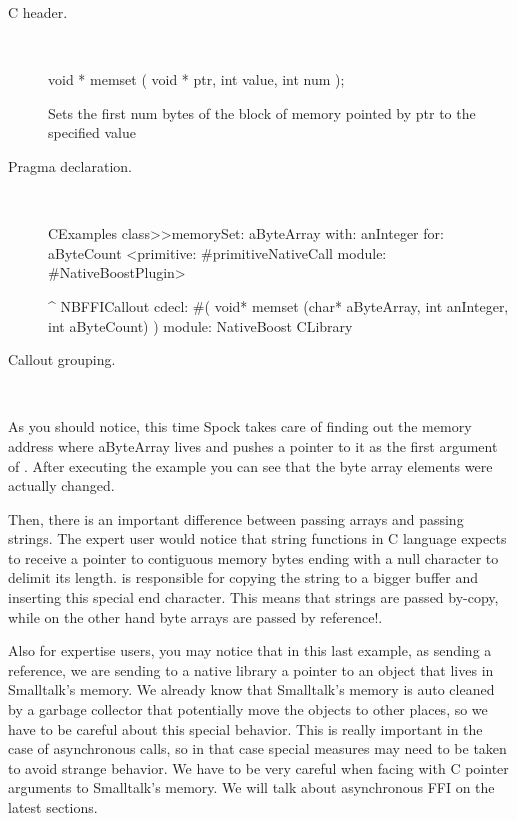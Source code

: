 \documentclass[a4paper,10pt,twoside]{book}
\begin{document}
\begin{description}
\item [C header.] \ 

\begin{code}{}
void * memset ( void * ptr, int value, int num );
\end{code}
Sets the first num bytes of the block of memory pointed by ptr to the specified value

\item [Pragma declaration.] \ 

\begin{code}{}
CExamples class>>memorySet: aByteArray with: anInteger for: aByteCount
	<primitive: #primitiveNativeCall module: #NativeBoostPlugin>
	
	^ NBFFICallout cdecl: #( void* memset (char* aByteArray, int anInteger, int aByteCount) ) module: NativeBoost CLibrary
\end{code}


\item [Callout grouping.] \ 
 

\end{description}

As you should notice, this time Spock takes care of finding out the memory address where aByteArray lives and pushes a pointer to it as the first argument of . After executing the example you can see that the byte array elements were actually changed. 

Then, there is an important difference between passing arrays and passing strings. The expert user would notice that string functions in C language expects to receive a pointer to contiguous memory bytes ending with a null character to delimit its length.  \Spock is responsible for copying the string to a bigger buffer and inserting this special end character. This means that strings are passed by-copy, while on the other hand byte arrays are passed by reference!.

Also for expertise users, you may notice that in this last example, as sending a reference, we are sending to a native library a pointer to an object that lives in Smalltalk's memory. We already know that Smalltalk's memory is auto cleaned by a garbage collector that potentially move the objects to other places, so we have to be careful about this special behavior. This is really important in the case of asynchronous calls, so in that case special measures may need to be taken to avoid strange behavior. We have to be very careful when facing with C pointer arguments to Smalltalk's memory. We will talk about asynchronous FFI on the latest sections.
\end{document}
